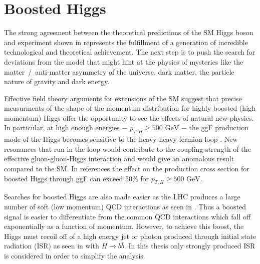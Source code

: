 \section{Boosted Higgs} \label{sec:higgs:boosted}

The strong agreement between the theoretical predictions of the SM Higgs boson
and experiment shown in  represents the
fulfillment of a generation of incredible technological and theoretical
achievement.  The next step is to push the search for deviations from the model
that might hint at the physics of mysteries like the matter~/~anti-matter
asymmetry of the universe, dark matter, the particle nature of gravity and dark
energy. 

Effective field theory arguments for extensions of the SM suggest that precise
measurments of the shape of the momentum distribution for highly boosted (high
momentum) Higgs offer the opportunity to see the effects of natural new
physics.  In particular, at high enough energies $-$ $p_{T,H} \geq \text{500
GeV}$ $-$ the ggF production mode of the Higgs becomes sensitive to the heavy
heavy fermion loop \cite{Schlaffer:2014osa}.  New resonances that run in the
loop would contribute to the coupling strength of the effective
gluon-gluon-Higgs interaction and would give an anomalous result compared to
the SM. In references \cite{Schlaffer:2014osa,Grojean:2013nya,Dawson:2015gka}
the effect on the production cross section for boosted Higgs through ggF can
exceed 50\% for $p_{T,H} \geq \text{500 GeV}$.

Searches for boosted Higgs are also made easier as the LHC produces a large
number of soft (low momentum) QCD interactions as seen in
.  Thus a boosted signal is easier to
differentiate from the common QCD interactions which fall off exponentially as
a function of momentum.  However, to achieve this boost, the Higgs must recoil
off of a high energy jet or photon \cite{Aaboud:2018zba} produced through
initial state radiation (ISR) as seen in  with $H \rightarrow
b\bar{b}$. In this thesis only strongly produced ISR is considered in order to
simplify the analysis.

